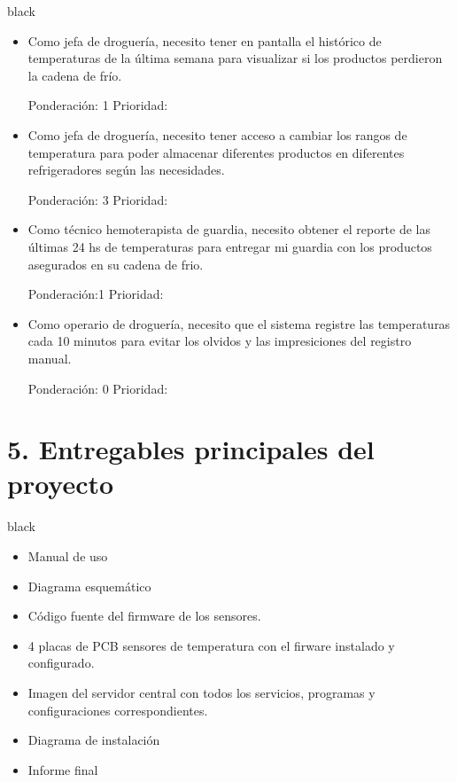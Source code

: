 \documentclass[11pt]{charter}
\begin{document}
\begin{consigna}{black}
\begin{itemize}
\item Como jefa de droguería, necesito tener en pantalla el histórico de temperaturas de la última semana para visualizar si los productos perdieron la cadena de frío. 

Ponderación: 1 Prioridad:
\end{itemize}

\begin{itemize}
\item Como jefa de droguería, necesito tener acceso a cambiar los rangos de temperatura para poder almacenar diferentes productos en diferentes refrigeradores según las necesidades. 

Ponderación: 3 Prioridad:
\end{itemize}

\begin{itemize}
\item Como técnico hemoterapista de guardia, necesito obtener el reporte de las últimas 24 hs de temperaturas para entregar mi guardia con los productos asegurados en su cadena de frio. 

Ponderación:1 Prioridad:
\end{itemize}

\begin{itemize}
\item Como operario de droguería, necesito que el sistema registre las temperaturas cada 10 minutos para evitar los olvidos y las impresiciones del registro manual. 

Ponderación: 0 Prioridad:
\end{itemize}

\end{consigna}

\section{5. Entregables principales del proyecto}
\label{sec:entregables}

\begin{consigna}{black}
\begin{itemize}
\item Manual de uso
\item Diagrama esquemático
\item Código fuente del firmware de los sensores.
\item 4 placas de PCB sensores de temperatura con el firware instalado y configurado.
\item Imagen del servidor central con todos los servicios, programas y configuraciones correspondientes.
\item Diagrama de instalación
\item Informe final

\end{itemize}

\end{consigna}
\end{document}
